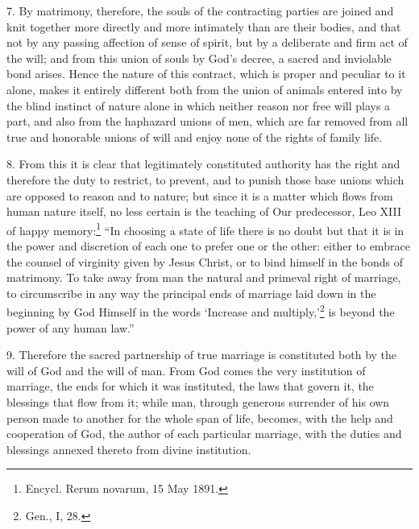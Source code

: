 \documentclass[12pt,a4paper]{book}
\begin{document}
7. By matrimony, therefore, the souls of the contracting parties are joined and knit together more directly and more intimately than are their bodies, and that not by any passing affection of sense of spirit, but by a deliberate and firm act of the will; and from this union of souls by God's decree, a sacred and inviolable bond arises. Hence the nature of this contract, which is proper and peculiar to it alone, makes it entirely different both from the union of animals entered into by the blind instinct of nature alone in which neither reason nor free will plays a part, and also from the haphazard unions of men, which are far removed from all true and honorable unions of will and enjoy none of the rights of family life.

8. From this it is clear that legitimately constituted authority has the right and therefore the duty to restrict, to prevent, and to punish those base unions which are opposed to reason and to nature; but since it is a matter which flows from human nature itself, no less certain is the teaching of Our predecessor, Leo XIII of happy memory:\footnote{Encycl. Rerum novarum, 15 May 1891.} ``In choosing a state of life there is no doubt but that it is in the power and discretion of each one to prefer one or the other: either to embrace the counsel of virginity given by Jesus Christ, or to bind himself in the bonds of matrimony. To take away from man the natural and primeval right of marriage, to circumscribe in any way the principal ends of marriage laid down in the beginning by God Himself in the words `Increase and multiply,'\footnote{Gen., I, 28.} is beyond the power of any human law.''

9. Therefore the sacred partnership of true marriage is constituted both by the will of God and the will of man. From God comes the very institution of marriage, the ends for which it was instituted, the laws that govern it, the blessings that flow from it; while man, through generous surrender of his own person made to another for the whole span of life, becomes, with the help and cooperation of God, the author of each particular marriage, with the duties and blessings annexed thereto from divine institution.
\end{document}
